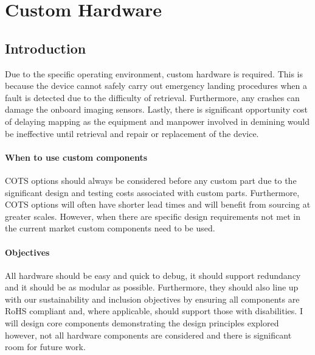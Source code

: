 \newpage
{}
\section{Custom Hardware} \label{section:Custom Hardware}
\subsection{Introduction}\label{sub_section:tgt_custom_hardware_intro}
Due to the specific operating environment, custom hardware is required. This is because the device cannot safely carry out emergency landing procedures when a fault is detected due to the difficulty of retrieval. Furthermore, any crashes can damage the onboard imaging sensors. Lastly, there is significant opportunity cost of delaying mapping as the equipment and manpower involved in demining would be ineffective until retrieval and repair or replacement of the device. 
\paragraph{When to use custom components}
\gls{COTS} options should always be considered before any custom part due to the significant design and testing costs associated with custom parts. Furthermore, \gls{COTS} options will often have shorter lead times and will benefit from sourcing at greater scales. However, when there are specific design requirements not met in the current market custom components need to be used.
\paragraph{Objectives}
All hardware should be easy and quick to debug, it should support redundancy and it should be as modular as possible. Furthermore, they should also line up with our sustainability and inclusion objectives by ensuring all components are \gls{RoHS} compliant and, where applicable, should support those with disabilities. I will design core components demonstrating the design principles explored however, not all hardware components are considered and there is significant room for future work.




